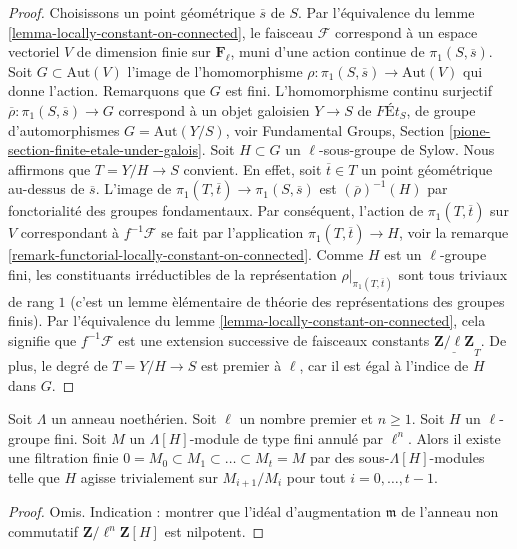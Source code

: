 \begin{proof}
Choisissons un point g\'eom\'etrique $\overline{s}$ de $S$.
Par l'\'equivalence du lemme \ref{lemma-locally-constant-on-connected},
le faisceau $\mathcal{F}$ correspond \`a un espace vectoriel
$V$ de dimension finie sur $\mathbf{F}_\ell$, muni d'une action continue de
$\pi_1(S, \overline{s})$.
Soit $G \subset \text{Aut}(V)$ l'image de l'homomorphisme
$\rho : \pi_1(S, \overline{s}) \to \text{Aut}(V)$ qui donne l'action.
Remarquons que $G$ est fini.
L'homomorphisme continu surjectif
$\overline{\rho} : \pi_1(S, \overline{s}) \to G$
correspond \`a un objet galoisien $Y \to S$ de
$\textit{F\'Et}_S$, de groupe d'automorphismes $G = \text{Aut}(Y/S)$, voir
Fundamental Groups, Section \ref{pione-section-finite-etale-under-galois}.
Soit $H \subset G$ un $\ell$-sous-groupe de Sylow.
Nous affirmons que $T = Y/H \to S$ convient. En effet, soit $\overline{t} \in T$
un point g\'eom\'etrique au-dessus de $\overline{s}$. L'image de
$\pi_1(T, \overline{t}) \to \pi_1(S, \overline{s})$
est $(\overline{\rho})^{-1}(H)$ par fonctorialit\'e
des groupes fondamentaux. Par cons\'equent, l'action de $\pi_1(T, \overline{t})$
sur $V$ correspondant \`a $f^{-1}\mathcal{F}$ se fait par
l'application $\pi_1(T, \overline{t}) \to H$, voir la
remarque \ref{remark-functorial-locally-constant-on-connected}. Comme
$H$ est un $\ell$-groupe fini, les constituants irr\'eductibles de la
repr\'esentation $\rho|_{\pi_1(T, \overline{t})}$
sont tous triviaux de rang $1$ (c'est un lemme \`el\'ementaire de
th\'eorie des repr\'esentations des groupes finis).
Par l'\'equivalence du
lemme \ref{lemma-locally-constant-on-connected},
cela signifie que $f^{-1}\mathcal{F}$ est une extension successive de
faisceaux constants $\underline{\mathbf{Z}/\ell\mathbf{Z}}_T$.
De plus, le degr\'e de $T = Y/H \to S$ est premier \`a $\ell$,
car il est \'egal \`a l'indice de $H$ dans $G$.
\end{proof}

\begin{lemma}
\label{lemma-action-l-group}
Soit $\Lambda$ un anneau noeth\'erien.
Soit $\ell$ un nombre premier et $n \geq 1$.
Soit $H$ un $\ell$-groupe fini.
Soit $M$ un $\Lambda[H]$-module de type fini annul\'e par $\ell^n$.
Alors il existe une filtration finie
$0 = M_0 \subset M_1 \subset \ldots \subset M_t = M$
par des sous-$\Lambda[H]$-modules
telle que $H$ agisse trivialement sur $M_{i + 1}/M_i$ pour tout
$i = 0, \ldots, t - 1$.
\end{lemma}

\begin{proof}
Omis. Indication : montrer que l'id\'eal d'augmentation $\mathfrak m$
de l'anneau non commutatif $\mathbf{Z}/\ell^n\mathbf{Z}[H]$
est nilpotent.
\end{proof}

